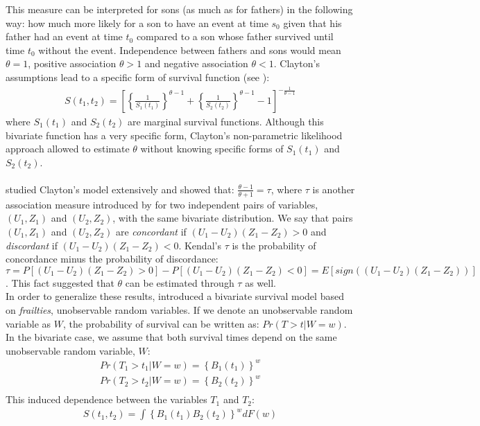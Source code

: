 \documentclass[]{article}
\begin{document}
This measure can be interpreted for sons (as much as for fathers) in the following way: how much more likely for a son to have an event at time $s_0$ given that his father had an event at time $t_0$ compared to a son whose father survived until time $t_0$ without the event. Independence between fathers and sons would mean $\theta = 1$, positive association $\theta > 1$ and negative association $\theta < 1$.
Clayton's assumptions lead to a specific form of survival function (see \cite{oakes1989bivariate}):
$$
\begin{aligned}
S(t_1,t_2) = \left[\left\{ \frac{1}{S_1(t_1)} \right\}^{\theta - 1} + \left\{ \frac{1}{S_2(t_2)} \right\}^{\theta - 1}   - 1 \right]^{-\frac{1}{\theta-1}}
\end{aligned}
$$
where $S_1(t_1)$ and $S_2(t_2)$ are marginal survival functions. Although this bivariate function has a very specific form, Clayton's non-parametric likelihood approach allowed to estimate $\theta$ without knowing specific forms of $S_1(t_1)$ and $S_2(t_2)$.\\
~\\
\cite{oakes1982model} studied Clayton's model extensively and showed that: $\frac{\theta - 1}{\theta + 1} = \tau$, where $\tau$ is another association measure introduced by  \cite{kendall1938new} for two independent pairs of variables, $(U_1, Z_1)$ and $(U_2, Z_2)$, with the same bivariate distribution. We say that pairs $(U_1, Z_1)$ and $(U_2, Z_2)$ are \emph{concordant} if $(U_1 - U_2)(Z_1 - Z_2)>0$ and \emph{discordant} if $(U_1 - U_2)(Z_1 - Z_2)<0$. Kendal's $\tau$ is the probability of concordance minus the probability of discordance:
$\tau = P[(U_1 - U_2)(Z_1 - Z_2)>0] - P[(U_1 - U_2)(Z_1 - Z_2)<0] = E[sign((U_1 - U_2)(Z_1 - Z_2))]$. This fact suggested that $\theta$ can be estimated through $\tau$ as well.\\

In order to generalize these results, \cite{oakes1989bivariate} introduced a bivariate survival model based on \emph{frailties}, unobservable random variables. If we denote an unobservable random variable as $W$, the probability of survival can be written as: $Pr(T>t|W=w)$. In the bivariate case, we assume that both survival times depend on the same unobservable random variable, $W$:
$$
\begin{aligned}
	Pr(T_1>t_1|W=w)=\left\{ B_1(t_1) \right\}^w\\
	Pr(T_2>t_2|W=w)=\left\{ B_2(t_2) \right\}^w\\
\end{aligned}
$$
This induced dependence between the variables $T_1$ and $T_2$:
$$
\begin{aligned}
	S(t_1,t_2) = \int \left\{ B_1(t_1) B_2(t_2)\right\}^w dF(w)
\end{aligned}
$$
\end{document}
